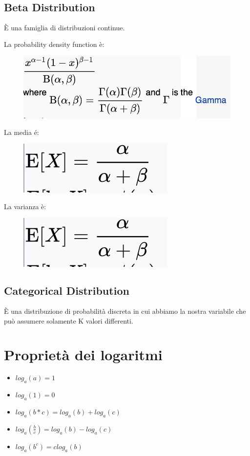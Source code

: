 \documentclass[14pt]{extreport}
\begin{document}
\subsection{Beta Distribution}

È una famiglia di distribuzioni continue.

La probability density function è:

\begin{figure}[H]
	\centering
	\includegraphics[width=0.5\linewidth]{124.jpeg}
\end{figure}

La media é:
\begin{figure}[H]
	\centering
	\includegraphics[width=0.4\linewidth]{125.jpeg}
\end{figure}

La varianza è:
\begin{figure}[H]
	\centering
	\includegraphics[width=0.4\linewidth]{125.jpeg}
\end{figure}

\subsection{Categorical Distribution}

È una distribuzione di probabilità discreta in cui abbiamo la nostra variabile che può assumere solamente K valori differenti.


\section{Proprietà dei logaritmi}

\begin{itemize}
	\item $log_a(a) = 1$
	\item $log_a(1) = 0$
	\item $log_a(b*c) = log_a(b)+log_a(c)$
	\item $log_a(\frac{b}{c}) = log_a(b)-log_a(c)$
	\item $log_a(b^c) = clog_a(b)$
\end{itemize}
\end{document}
